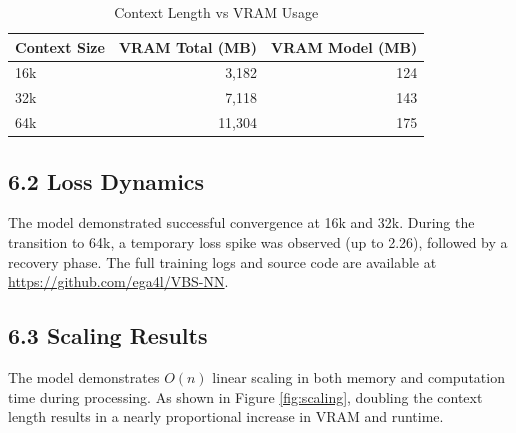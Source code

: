 \documentclass[a4paper,12pt]{article}
\begin{document}
\begin{table}[h]
    \centering
    \caption{Context Length vs VRAM Usage}
    \label{tab:vram}
    \begin{tabular}{lrr}
        \toprule
        Context Size & VRAM Total (MB) & VRAM Model (MB) \\
        \midrule
        16k & 3,182 & 124 \\
        32k & 7,118 & 143 \\
        64k & 11,304 & 175 \\
        \bottomrule
    \end{tabular}
\end{table}

\subsection*{6.2 Loss Dynamics}
The model demonstrated successful convergence at 16k and 32k. During the transition to 64k, a temporary loss spike was observed (up to 2.26), followed by a recovery phase. The full training logs and source code are available at \url{https://github.com/ega4l/VBS-NN}.

\subsection*{6.3 Scaling Results}
The model demonstrates $O(n)$ linear scaling in both memory and computation time during processing. As shown in Figure \ref{fig:scaling}, doubling the context length results in a nearly proportional increase in VRAM and runtime.
\end{document}
